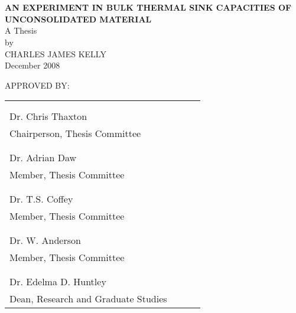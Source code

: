 

\thispagestyle{empty}
\doublespacing
\section*{}
\begin{center}
\vspace*{-18mm}
\textbf{AN EXPERIMENT IN BULK THERMAL SINK CAPACITIES OF UNCONSOLIDATED MATERIAL\\}
\vspace*{25mm}A Thesis\\by\\CHARLES JAMES KELLY\\December 2008\\
\end{center}

\vspace*{25mm}
\singlespacing
\noindent APPROVED BY:\vspace*{6mm}

\noindent
\begin{tabular}{llll}
& & &\\
& & &\\
\hline
Dr. Chris Thaxton & & &\\
Chairperson, Thesis Committee & & &\\
& & &\\
& & &\\
\hline
Dr. Adrian Daw & & &\\
Member, Thesis Committee & & &\\
& & &\\
& & &\\
\hline
Dr. T.S. Coffey & & &\\
Member, Thesis Committee & & &\\
& & &\\
& & &\\
\hline
Dr. W. Anderson & & &\\
Member, Thesis Committee & & &\\
& & &\\
& & &\\
\hline
Dr. Edelma D. Huntley\\
Dean, Research and Graduate Studies\\

\end{tabular}
